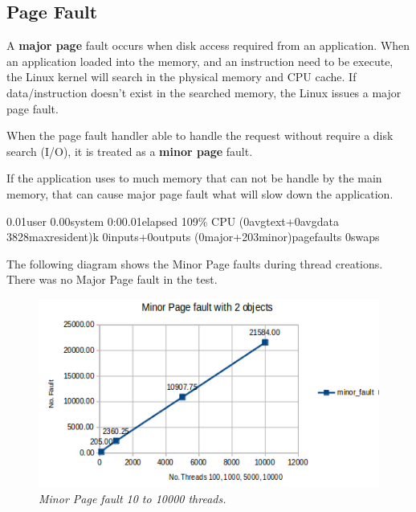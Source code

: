 \documentclass[12pt]{article}
\begin{document}
\subsection{Page Fault}
A \textbf{major page} fault occurs when disk access required from an application. When an application loaded into the memory, and an instruction need to be execute, the Linux kernel will search in the physical memory and CPU cache. If data/instruction doesn't exist in the searched memory, the Linux issues a major page fault.\\
\begin{flushleft}
When the page fault handler able to handle the request without require a disk search (I/O), it is treated as a \textbf{minor page} fault.
\end{flushleft}
\begin{flushleft}
If the application uses to much memory that can not be handle by the main memory, that can cause major page fault what will slow down the application.
\end{flushleft}

\begin{flushleft}
0.01user 0.00system 0:00.01elapsed 109\% CPU (0avgtext+0avgdata 3828maxresident)k
0inputs+0outputs (0major+203minor)pagefaults 0swaps
\end{flushleft}

\begin{flushleft}
The following diagram shows the Minor Page faults during thread creations. There was no Major Page fault in the test.
\end{flushleft}

\begin{figure}[h!]
\centering
\includegraphics[scale=0.6]{Pictures/minor_fault.png}
\caption*{\textit{\color{gray}Minor Page fault 10 to 10000 threads.}}
\end{figure}
\end{document}
